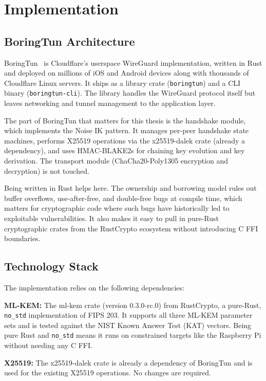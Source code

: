 \chapter{Implementation}
\label{chap:implementation}

\section{BoringTun Architecture}

BoringTun~\cite{boringtun} is Cloudflare's userspace WireGuard implementation, written in Rust and deployed on millions of iOS and Android devices along with thousands of Cloudflare Linux servers. It ships as a library crate (\texttt{boringtun}) and a CLI binary (\texttt{boringtun-cli}). The library handles the WireGuard protocol itself but leaves networking and tunnel management to the application layer.

The part of BoringTun that matters for this thesis is the handshake module, which implements the Noise IK pattern. It manages per-peer handshake state machines, performs X25519 operations via the x25519-dalek crate (already a dependency), and uses HMAC-BLAKE2s for chaining key evolution and key derivation. The transport module (ChaCha20-Poly1305 encryption and decryption) is not touched.

Being written in Rust helps here. The ownership and borrowing model rules out buffer overflows, use-after-free, and double-free bugs at compile time, which matters for cryptographic code where such bugs have historically led to exploitable vulnerabilities. It also makes it easy to pull in pure-Rust cryptographic crates from the RustCrypto ecosystem without introducing C FFI boundaries.

\section{Technology Stack}

The implementation relies on the following dependencies:

\textbf{ML-KEM:} The ml-kem crate (version 0.3.0-rc.0) from RustCrypto, a pure-Rust, \texttt{no\_std} implementation of FIPS 203. It supports all three ML-KEM parameter sets and is tested against the NIST Known Answer Test (KAT) vectors. Being pure Rust and \texttt{no\_std} means it runs on constrained targets like the Raspberry Pi without needing any C FFI.

\textbf{X25519:} The x25519-dalek crate is already a dependency of BoringTun and is used for the existing X25519 operations. No changes are required.

